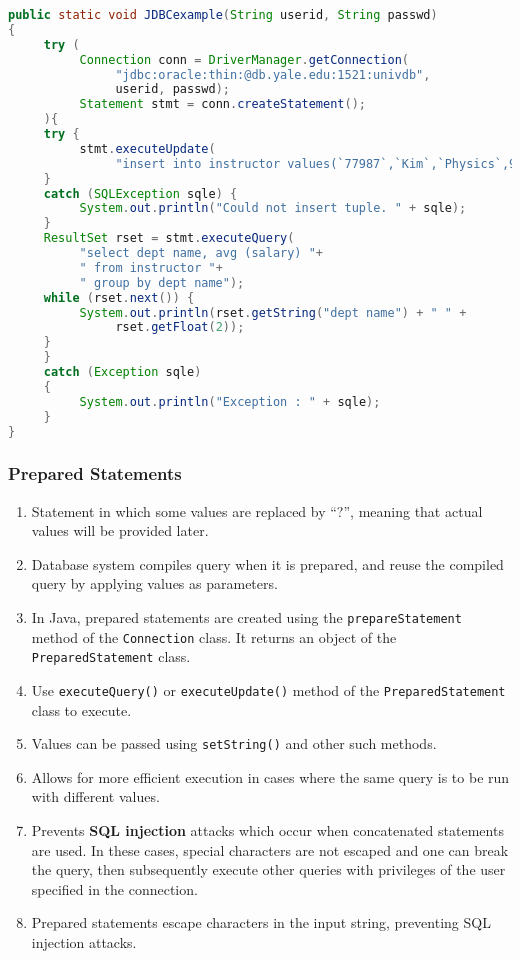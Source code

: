 \documentclass[journal,12pt,twocolumn]{IEEEtran}
\begin{document}
\begin{lstlisting}[language=java,caption={Example Usage of JDBC}]
public static void JDBCexample(String userid, String passwd)
{
     try (
          Connection conn = DriverManager.getConnection(
               "jdbc:oracle:thin:@db.yale.edu:1521:univdb",
               userid, passwd);
          Statement stmt = conn.createStatement();
     ){
     try {
          stmt.executeUpdate(
               "insert into instructor values(`77987`,`Kim`,`Physics`,98000)");
     }
     catch (SQLException sqle) {
          System.out.println("Could not insert tuple. " + sqle);
     }
     ResultSet rset = stmt.executeQuery(
          "select dept name, avg (salary) "+
          " from instructor "+
          " group by dept name");
     while (rset.next()) {
          System.out.println(rset.getString("dept name") + " " +
               rset.getFloat(2));
     }
     }
     catch (Exception sqle)
     {
          System.out.println("Exception : " + sqle);
     }
} 
\end{lstlisting}

\subsubsection{Prepared Statements}

\begin{enumerate}
     \item Statement in which some values are replaced by ``?'', meaning that
     actual values will be provided later.
     \item Database system compiles query when it is prepared, and reuse the
     compiled query by applying values as parameters.
     \item In Java, prepared statements are created using the 
     \texttt{prepareStatement} method of the \texttt{Connection} class. It
     returns an object of the \texttt{PreparedStatement} class.
     \item Use \texttt{executeQuery()} or \texttt{executeUpdate()} 
     method of the \texttt{PreparedStatement} class to execute.
     \item Values can be passed using \texttt{setString()} and other such 
     methods.
     \item Allows for more efficient execution in cases where the same query
     is to be run with different values.
     \item Prevents \textbf{SQL injection} attacks which occur when
     concatenated statements are used. In these cases, special characters are
     not escaped and one can break the query, then subsequently execute other
     queries with privileges of the user specified in the connection.
     \item Prepared statements escape characters in the input string, 
     preventing SQL injection attacks.
\end{enumerate}
\end{document}
